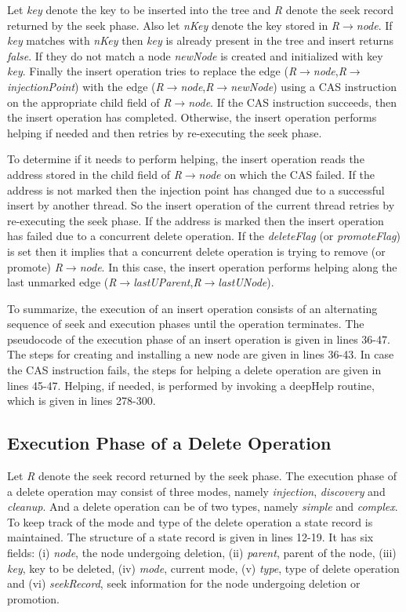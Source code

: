 \documentclass[11pt]{article}
\begin{document}
\begin{multicols}{2}
Let \textit{key} denote the key to be inserted into the tree and \textit{R} denote the seek record returned by the seek phase. Also let \textit{nKey} denote the key stored in \textit{R$\rightarrow$node}. If \textit{key} matches with \textit{nKey} then \textit{key} is already present in the tree and insert returns \textit{false}. If they do not match a node \textit{newNode} is created and initialized with key \textit{key}. Finally the insert operation tries to replace the edge (\textit{R$\rightarrow$node},\textit{R$\rightarrow$injectionPoint}) with the edge (\textit{R$\rightarrow$node},\textit{R$\rightarrow$newNode}) using a CAS instruction on the appropriate child field of \textit{R$\rightarrow$node}. If the CAS instruction succeeds, then the insert operation has completed. Otherwise, the insert operation performs helping if needed and then retries by re-executing the seek phase. \par
To determine if it needs to perform helping, the insert operation reads the address stored in the child field of \textit{R$\rightarrow$node} on which the CAS failed. If the address is not marked then the injection point has changed due to a successful insert by another thread. So the insert operation of the current thread retries by re-executing the seek phase. If the address is marked then the insert operation has failed due to a concurrent delete operation. If the \textit{deleteFlag} (or \textit{promoteFlag}) is set then it implies that a concurrent delete operation is trying to remove (or promote) \textit{R$\rightarrow$node}. In this case, the insert operation performs helping along the last unmarked edge (\textit{R$\rightarrow$lastUParent},\textit{R$\rightarrow$lastUNode}).\par
To summarize, the execution of an insert operation consists of an alternating sequence of seek and execution phases until the operation terminates. The pseudocode of the execution phase of an insert operation is given in lines 36-47. The steps for creating and installing a new node are given in lines 36-43. In case the CAS instruction fails, the steps for helping a delete operation are given in lines 45-47. Helping, if needed, is performed by invoking a deepHelp routine, which is given in lines 278-300.

\subsection{Execution Phase of a Delete Operation}
Let \textit{R} denote the seek record returned by the seek phase. The execution phase of a delete operation may consist of three modes, namely \textit{injection}, \textit{discovery} and \textit{cleanup}. And a delete operation can be of two types, namely \textit{simple} and \textit{complex}. To keep track of the mode and type of the delete operation a state record is maintained. The structure of a state record is given in lines 12-19. It has six fields: (i) \textit{node}, the node undergoing deletion, (ii) \textit{parent}, parent of the node, (iii) \textit{key}, key to be deleted, (iv) \textit{mode}, current mode, (v) \textit{type}, type of delete operation and (vi) \textit{seekRecord}, seek information for the node undergoing deletion or promotion.


\end{multicols}
\end{document}
